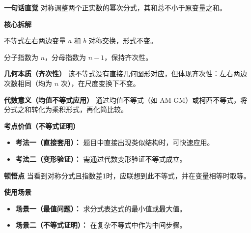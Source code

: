 \begin{explanationbox}
\textbf{\textcolor{CExplanation}{一句话直觉}}
对称调整两个正实数的幂次分式，其和总不小于原变量之和。

\medskip
\textbf{\textcolor{CExplanation}{核心拆解}}
\begin{description}[style=nextline, leftmargin=2.8em, labelsep=0.5em, itemsep=0.45em]
    \item[\textbf{要点一（对称性）：}] 不等式左右两边变量 $a$ 和 $b$ 对称交换，形式不变。
    \item[\textbf{要点二（幂次关联）：}] 分子指数为 $n$，分母指数为 $n-1$，保持齐次性。
\end{description}

\medskip
\textbf{\textcolor{CExplanation}{几何本质（齐次性）}}
该不等式没有直接几何图形对应，但体现齐次性：左右两边次数相同（均为 $n$ 次），在尺度变换下不变。

\medskip
\textbf{\textcolor{CExplanation}{代数意义（均值不等式应用）}}
通过均值不等式（如 AM-GM）或柯西不等式，将分式之和转化为乘积形式，再化简比较。

\medskip
\textbf{\textcolor{CExplanation}{考点价值（不等式证明）}}
\begin{itemize}[leftmargin=*, itemsep=0.5em, topsep=0.4em]
    \item \textbf{考法一（直接套用）：} 题目中直接出现类似结构时，可快速应用。
    \item \textbf{考法二（变形验证）：} 需通过代数变形验证不等式成立。
\end{itemize}

\medskip
\textbf{\textcolor{CExplanation}{顿悟点}}
当看到对称分式且指数差1时，应联想到此不等式，并在变量相等时取等。

\medskip
\textbf{\textcolor{CExplanation}{使用场景}}
\begin{itemize}[leftmargin=*, itemsep=0.5em, topsep=0.4em]
    \item \textbf{场景一（最值问题）：} 求分式表达式的最小值或最大值。
    \item \textbf{场景二（不等式证明）：} 在复杂不等式中作为中间步骤。
\end{itemize}
\end{explanationbox}
